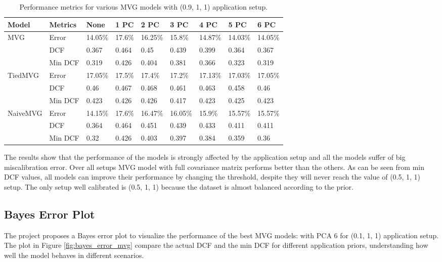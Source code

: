 \documentclass{article}
\begin{document}
\begin{table}[ht]
    \centering
    \begin{tabularx}{\textwidth}{ll*{7}{X}}
        \toprule
        \textbf{Model} & \textbf{Metrics} & \textbf{None} & \textbf{1 PC} & \textbf{2 PC} & \textbf{3 PC} & \textbf{4 PC} & \textbf{5 PC} & \textbf{6 PC} \\
        \midrule
        \multirow{3}{*}{MVG} & Error & 14.05\% & 17.6\% & 16.25\% & 15.8\% & 14.87\% & 14.03\% & 14.05\% \\
                              & DCF & 0.367 & 0.464 & 0.45 & 0.439 & 0.399 & 0.364 & 0.367 \\
                              & Min DCF & 0.319 & 0.426 & 0.404 & 0.381 & 0.366 & 0.323 & 0.319 \\
        \midrule
        \multirow{3}{*}{TiedMVG} & Error & 17.05\% & 17.5\% & 17.4\% & 17.2\% & 17.13\% & 17.03\% & 17.05\% \\
                                 & DCF & 0.46 & 0.467 & 0.468 & 0.461 & 0.463 & 0.458 & 0.46 \\
                                 & Min DCF & 0.423 & 0.426 & 0.426 & 0.417 & 0.423 & 0.425 & 0.423 \\
        \midrule
        \multirow{3}{*}{NaiveMVG} & Error & 14.15\% & 17.6\% & 16.47\% & 16.05\% & 15.9\% & 15.57\% & 15.57\% \\
                                  & DCF & 0.364 & 0.464 & 0.451 & 0.439 & 0.433 & 0.411 & 0.411 \\
                                  & Min DCF & 0.32 & 0.426 & 0.403 & 0.397 & 0.384 & 0.359 & 0.36 \\
        \bottomrule
    \end{tabularx}
    \caption{Performance metrics for various MVG models with (0.9, 1, 1) application setup.}
    \label{tab:mvg_performance_9_1_1}
\end{table}

The results show that the performance of the models is strongly affected by the application setup and all the models suffer of big miscalibration error. Over all setups MVG model with full covariance matrix performs better than the others. As can be seen from min DCF values, all models can improve their performance by changing the threshold, despite they will never reach the value of (0.5, 1, 1) setup. The only setup well calibrated is (0.5, 1, 1) because the dataset is almost balanced according to the prior.

\subsection{Bayes Error Plot}
The project proposes a Bayes error plot to visualize the performance of the best MVG models: with PCA 6 for (0.1, 1, 1) application setup. The plot in Figure \ref{fig:bayes_error_mvg} compare the actual DCF and the min DCF for different application priors, understanding how well the model behaves in different scenarios.
\end{document}
